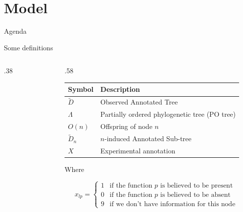 \documentclass[9pt,ignorenonframetext,]{beamer}
\newcommand{\includetikz}[2]{
\begin{figure}
\scalebox{#2}{

}
\end{figure}
}
\newcommand{\phylo}{\Lambda{}} %
\newcommand{\aphylo}{D{}}      %
\newcommand{\aphyloObs}{\tilde \aphylo{}} %
\newcommand{\AnnObs}{X{}}
\newcommand{\annObs}{x{}}
\def\begincols{\begin{columns}[T]}
\def\begincol{\begin{column}[T]}
\def\endcol{\end{column}}
\def\endcols{\end{columns}}
\begin{document}
\section{Model}\label{model}

\begin{frame}[t]{Agenda}

\tableofcontents[currentsection]

\end{frame}

\begin{frame}[t,label=definitions]{Some definitions}

\begincols

\begincol{.38\linewidth}

\includetikz{simple_tree_names.tex}{.5}

\endcol

\begincol{.58\linewidth}

\footnotesize

\begin{longtable}[]{@{}ll@{}}
\toprule
Symbol & Description\tabularnewline
\midrule
\endhead
\(\aphyloObs\) & Observed Annotated Tree\tabularnewline
\(\phylo\) & Partially ordered phylogenetic tree (PO
tree)\tabularnewline
\(O(n)\) & Offspring of node \(n\)\tabularnewline
\(\aphyloObs_n\) & \(n\)-induced Annotated Sub-tree\tabularnewline
\(\AnnObs\) & Experimental annotation\tabularnewline
\bottomrule
\end{longtable}

Where

\[
\annObs_{lp} = \left\{
\begin{array}{ll}
1 & \mbox{if the function }p\mbox{ is believed to be present}\\
0 & \mbox{if the function }p\mbox{ is believed to be absent}\\
9 & \mbox{if we don't have information for this node }
\end{array}\right.
\]

\normalsize

\hyperlink{formaldef}{}

\endcol

\endcols

\end{frame}
\end{document}
